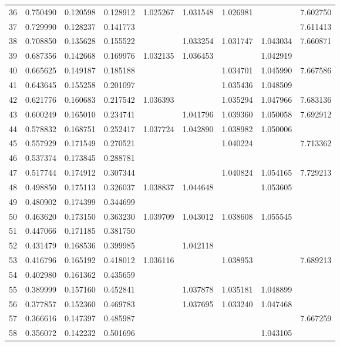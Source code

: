\documentclass{elsarticle}
\begin{document}
\begin{center}
\begin{longtable}{|c|ccc|cccc|c|}
  36 & 0.750490 & 0.120598 & 0.128912 & 1.025267 & 1.031548 & 1.026981 &  & 7.602750 \\
  37 & 0.729990 & 0.128237 & 0.141773 &  &  &  &  & 7.611413 \\
  38 & 0.708850 & 0.135628 & 0.155522 &  & 1.033254 & 1.031747 & 1.043034 & 7.660871 \\
  39 & 0.687356 & 0.142668 & 0.169976 & 1.032135 & 1.036453 &  & 1.042919 &  \\
  40 & 0.665625 & 0.149187 & 0.185188 &  &  & 1.034701 & 1.045990 & 7.667586 \\
  41 & 0.643645 & 0.155258 & 0.201097 &  &  & 1.035436 & 1.048509 &  \\
  42 & 0.621776 & 0.160683 & 0.217542 & 1.036393 &  & 1.035294 & 1.047966 & 7.683136 \\
  43 & 0.600249 & 0.165010 & 0.234741 &  & 1.041796 & 1.039360 & 1.050058 & 7.692912 \\
  44 & 0.578832 & 0.168751 & 0.252417 & 1.037724 & 1.042890 & 1.038982 & 1.050006 &  \\
  45 & 0.557929 & 0.171549 & 0.270521 &  &  & 1.040224 &  & 7.713362 \\
  46 & 0.537374 & 0.173845 & 0.288781 &  &  &  &  &  \\
  47 & 0.517744 & 0.174912 & 0.307344 &  &  & 1.040824 & 1.054165 & 7.729213 \\
  48 & 0.498850 & 0.175113 & 0.326037 & 1.038837 & 1.044648 &  & 1.053605 &  \\
  49 & 0.480902 & 0.174399 & 0.344699 &  &  &  &  &  \\
  50 & 0.463620 & 0.173150 & 0.363230 & 1.039709 & 1.043012 & 1.038608 & 1.055545 &  \\
  51 & 0.447066 & 0.171185 & 0.381750 &  &  &  &  &  \\
  52 & 0.431479 & 0.168536 & 0.399985 &  & 1.042118 &  &  &  \\
  53 & 0.416796 & 0.165192 & 0.418012 & 1.036116 &  & 1.038953 &  & 7.689213 \\
  54 & 0.402980 & 0.161362 & 0.435659 &  &  &  &  &  \\
  55 & 0.389999 & 0.157160 & 0.452841 &  & 1.037878 & 1.035181 & 1.048899 &  \\
  56 & 0.377857 & 0.152360 & 0.469783 &  & 1.037695 & 1.033240 & 1.047468 &  \\
  57 & 0.366616 & 0.147397 & 0.485987 &  &  &  &  & 7.667259 \\
  58 & 0.356072 & 0.142232 & 0.501696 &  &  &  & 1.043105 &  \\

\end{longtable}
\end{center}
\end{document}
